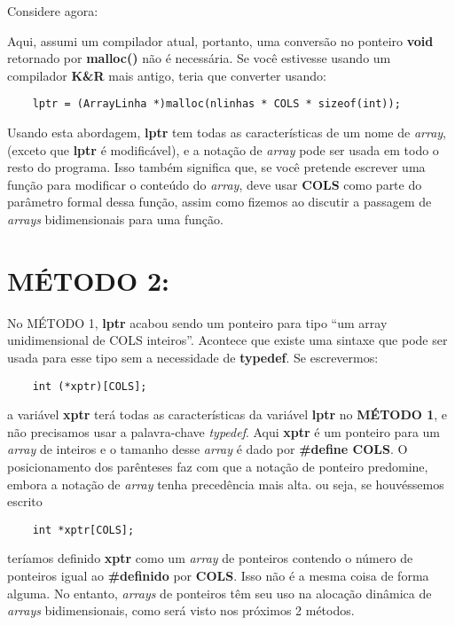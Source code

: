 Considere agora:


Aqui, assumi um compilador atual, portanto, uma conversão no ponteiro \textbf{void} retornado por \textbf{malloc()} não é necessária. Se você estivesse usando um compilador \textbf{K\&R }mais antigo, teria que converter usando:
\begin{lstlisting}
	lptr = (ArrayLinha *)malloc(nlinhas * COLS * sizeof(int));
\end{lstlisting}

Usando esta abordagem, \textbf{lptr} tem todas as características de um nome de \textit{array}, (exceto que \textbf{lptr} é modificável), e a notação de \textit{array} pode ser usada em todo o resto do programa. Isso também significa que, se você pretende escrever uma função para modificar o conteúdo do \textit{array}, deve usar \textbf{COLS} como parte do parâmetro formal dessa função, assim como fizemos ao discutir a passagem de \textit{arrays} bidimensionais para uma função.

\section*{MÉTODO 2:}
No MÉTODO 1, \textbf{lptr} acabou sendo um ponteiro para tipo ``um array unidimensional de COLS inteiros''. Acontece que existe uma sintaxe que pode ser usada para esse tipo sem a necessidade de \textbf{typedef}. Se escrevermos:
\begin{lstlisting}
	int (*xptr)[COLS];
\end{lstlisting}
a variável \textbf{xptr} terá todas as características da variável \textbf{lptr} no \textbf{MÉTODO 1}, e não precisamos usar a palavra-chave \textit{typedef}. Aqui \textbf{xptr} é um ponteiro para um \textit{array} de inteiros e o tamanho desse \textit{array} é dado por \textbf{\#define COLS}. O posicionamento dos parênteses faz com que a notação de ponteiro predomine, embora a notação de \textit{array} tenha precedência mais alta. ou seja, se houvéssemos escrito
\begin{lstlisting}
	int *xptr[COLS];
\end{lstlisting}
teríamos definido \textbf{xptr} como um \textit{array} de ponteiros contendo o número de ponteiros igual ao \textbf{\#definido} por \textbf{COLS}. Isso não é a mesma coisa de forma alguma. No entanto, \textit{arrays} de ponteiros têm seu uso na alocação dinâmica de \textit{arrays} bidimensionais, como será visto nos próximos 2 métodos.

